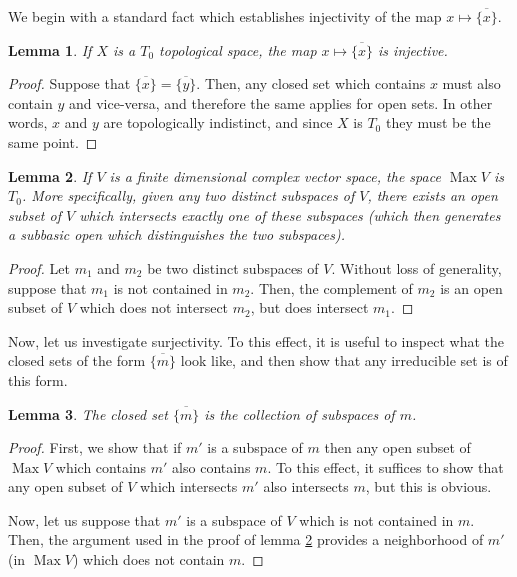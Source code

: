 \documentclass{article}
\theoremstyle{plain}
\newtheorem{lemma}{Lemma}
\theoremstyle{nonumberplain}
\newtheorem{proof}{Proof}
\DeclareMathOperator{\Max}{Max}
\begin{document}
We begin with a standard fact which establishes injectivity of the map $x \mapsto \overline{\{x\}}$.

\begin{lemma}
If $X$ is a $T_0$ topological space, the map $x \mapsto \overline{\{x\}}$ is injective.
\end{lemma}

\begin{proof}
Suppose that $\overline{\{x\}} = \overline{\{y\}}$. Then, any closed set which contains $x$ must also contain $y$ and vice-versa, and therefore the same applies for open sets. In other words, $x$ and $y$ are topologically indistinct, and since $X$ is $T_0$ they must be the same point.
\end{proof}

\begin{lemma}\label{maxist0}
If $V$ is a finite dimensional complex vector space, the space $\Max V$ is $T_0$. More specifically, given any two distinct subspaces of $V$, there exists an open subset of $V$ which intersects exactly one of these subspaces (which then generates a subbasic open which distinguishes the two subspaces).
\end{lemma}

\begin{proof}
Let $m_1$ and $m_2$ be two distinct subspaces of $V$. Without loss of generality, suppose that $m_1$ is not contained in $m_2$. Then, the complement of $m_2$ is an open subset of $V$ which does not intersect $m_2$, but does intersect $m_1$.
\end{proof}

Now, let us investigate surjectivity. To this effect, it is useful to inspect what the closed sets of the form $\overline{\{m\}}$ look like, and then show that any irreducible set is of this form.

\begin{lemma}
The closed set $\overline{\{m\}}$ is the collection of subspaces of $m$.
\end{lemma}

\begin{proof}
First, we show that if $m'$ is a subspace of $m$ then any open subset of $\Max V$ which contains $m'$ also contains $m$. To this effect, it suffices to show that any open subset of $V$ which intersects $m'$ also intersects $m$, but this is obvious.

Now, let us suppose that $m'$ is a subspace of $V$ which is not contained in $m$. Then, the argument used in the proof of lemma \ref{maxist0} provides a neighborhood of $m'$ (in $\Max V$) which does not contain $m$.
\end{proof}
\end{document}
